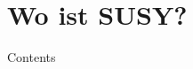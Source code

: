 \documentclass[hyperref={pdfpagelabels=false},ngerman]{beamer}
\newcommand{\MS}{\ensuremath{M_S}}
\renewcommand{\emph}[1]{\textbf{\textcolor{darkblue}{#1}}}
\begin{document}

\section{Wo ist SUSY?}

\begin{frame}{Contents}
  \tableofcontents[currentsection]  
\end{frame}


\end{document}
